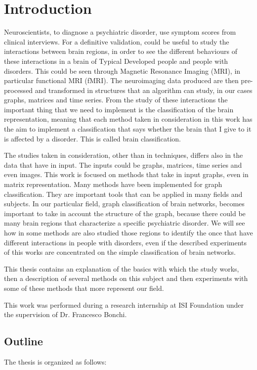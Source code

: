 \chapter{Introduction}
\label{chap:1}

Neuroscientists, to diagnose a psychiatric disorder, use symptom scores from clinical interviews. For a definitive validation, could be useful to study the interactions between brain regions, in order to see the different behaviours of these interactions in a brain of Typical Developed people and people with disorders. This could be seen through Magnetic Resonance Imaging (MRI), in particular functional MRI (fMRI). The neuroimaging data produced are then pre-processed and transformed in structures that an algorithm can study, in our cases graphs, matrices and time series. From the study of these interactions the important thing that we need to implement is the classification of the brain representation, meaning that each method taken in consideration in this work has the aim to implement a classification that says whether the brain that I give to it is affected by a disorder. This is called brain classification. 

The studies taken in consideration, other than in techniques, differs also in the data that have in input. The inputs could be graphs, matrices, time series and even images. This work is focused on methods that take in input graphs, even in matrix representation. Many methods have been implemented for graph classification. They are important tools that can be applied in many fields and subjects. In our particular field, graph classification of brain networks, becomes important to take in account the structure of the graph, because there could be many brain regions that characterize a specific psychiatric disorder. We will see how in some methods are also studied those regions to identify the once that have different interactions in people with disorders, even if the described experiments of this works are concentrated on the simple classification of brain networks. 

This thesis contains an explanation of the basics with which the study works, then a description of several methods on this subject and then experiments with some of these methods that more represent our field. 

This work was performed during a research internship at ISI Foundation
under the supervision of Dr. Francesco Bonchi.

\section{Outline}
The thesis is organized as follows:

